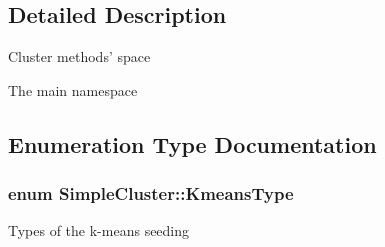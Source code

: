 \subsection{Detailed Description}
Cluster methods' space

The main namespace 

\subsection{Enumeration Type Documentation}
\hypertarget{namespaceSimpleCluster_a8a8f57121b69a7b43575e4d6a53928e2}{
\subsubsection[{Kmeans\+Type}]{\setlength{\rightskip}{0pt plus 5cm}enum {\bf Simple\+Cluster\+::\+Kmeans\+Type}\hspace{0.3cm}{\ttfamily [strong]}}}\label{namespaceSimpleCluster_a8a8f57121b69a7b43575e4d6a53928e2}
Types of the k-\/means seeding 

